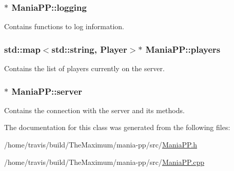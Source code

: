 \hypertarget{classManiaPP_aa4cea090301bdf0bf652ad377e7b01c0}{
\subsubsection[{logging}]{$\ast$ Mania\-P\-P\-::logging\hspace{0.3cm}{\ttfamily [private]}}}\label{classManiaPP_aa4cea090301bdf0bf652ad377e7b01c0}


Contains functions to log information. 

\hypertarget{classManiaPP_a45712ccfa91b20242b39cb1164d305d8}{
\subsubsection[{players}]{\setlength{\rightskip}{0pt plus 5cm}std\-::map$<$std\-::string, {\bf Player}$>$$\ast$ Mania\-P\-P\-::players\hspace{0.3cm}{\ttfamily [private]}}}\label{classManiaPP_a45712ccfa91b20242b39cb1164d305d8}


Contains the list of players currently on the server. 

\hypertarget{classManiaPP_ab81311d6901990cb99a7a30e0cbaab11}{
\subsubsection[{server}]{$\ast$ Mania\-P\-P\-::server\hspace{0.3cm}{\ttfamily [private]}}}\label{classManiaPP_ab81311d6901990cb99a7a30e0cbaab11}


Contains the connection with the server and its methods. 



The documentation for this class was generated from the following files\-:\begin{DoxyCompactItemize}
\item 
/home/travis/build/\-The\-Maximum/mania-\/pp/src/\hyperlink{ManiaPP_8h}{Mania\-P\-P.\-h}\item 
/home/travis/build/\-The\-Maximum/mania-\/pp/src/\hyperlink{ManiaPP_8cpp}{Mania\-P\-P.\-cpp}\end{DoxyCompactItemize}
